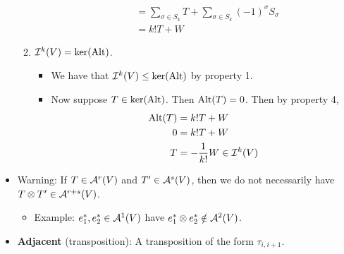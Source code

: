 \documentclass[../notes.tex]{subfiles}
\begin{document}
\begin{itemize}
\begin{enumerate}
\begin{itemize}
\begin{align*}
                &= \sum_{\sigma\in S_k}T+\sum_{\sigma\in S_k}(-1)^\sigma S_\sigma\\
                &= k!T+W
            \end{align*}
        \end{itemize}
        \item $\ide[k]{V}=\ker(\Alt)$.
        \begin{itemize}
            \item We have that $\ide[k]{V}\leq\ker(\Alt)$ by property 1.
            \item Now suppose $T\in\ker(\Alt)$. Then $\Alt(T)=0$. Then by property 4,
            \begin{align*}
                \Alt(T) &= k!T+W\\
                0 &= k!T+W\\
                T &= -\frac{1}{k!}W \in \ide[k]{V}
            \end{align*}
        \end{itemize}
    \end{enumerate}
    \item Warning: If $T\in\alt[r]{V}$ and $T'\in\alt[s]{V}$, then we do not necessarily have $T\otimes T'\in\alt[r+s]{V}$.
    \begin{itemize}
        \item Example: $e_1^*,e_2^*\in\alt[1]{V}$ have $e_1^*\otimes e_2^*\notin\alt[2]{V}$.
    \end{itemize}
    \item \textbf{Adjacent} (transposition): A transposition of the form $\tau_{i,i+1}$.
\end{itemize}
\end{document}
